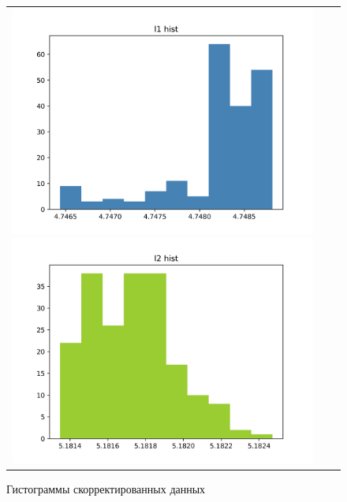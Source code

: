 \begin{figure}[H]
	\begin{tabular}{ccc}
		\includegraphics[scale=0.5]{resources/fhyst_PR1.png}
		\includegraphics[scale=0.5]{resources/fhyst_PR2.png}
	\end{tabular} \label{pic:corrected}
	\caption{Гистограммы скорректированных данных} 
\end{figure}

